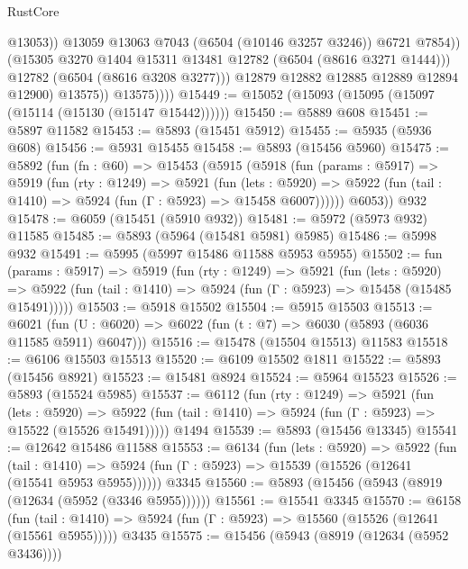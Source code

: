 \begin{lexlean}{RustCore}
\begin{coremodule}
                            @13053))
                        @13059
                        @13063
                        @7043
                        (@6504 (@10146 @3257 @3246))
                        @6721
                        @7854))
                    (@15305 @3270 @1404 @15311 @13481 @12782 (@6504 (@8616 @3271 @1444)))
                    @12782
                    (@6504 (@8616 @3208 @3277)))
                  @12879
                  @12882
                  @12885
                  @12889
                  @12894
                  @12900)
                @13575))
            @13575))))
@15449 := @15052 (@15093 (@15095 (@15097 (@15114 (@15130 (@15147 @15442))))))
@15450 := @5889 @608
@15451 := @5897 @11582
@15453 := @5893 (@15451 @5912)
@15455 := @5935 (@5936 @608)
@15456 := @5931 @15455
@15458 := @5893 (@15456 @5960)
@15475 := @5892
    (fun (fn : @60) =>
    @15453
      (@5915
        (@5918
          (fun (params : @5917) =>
          @5919
            (fun (rty : @1249) =>
            @5921
              (fun (lets : @5920) =>
              @5922 (fun (tail : @1410) => @5924 (fun (Γ : @5923) => @15458 @6007))))))
        @6053))
    @932
@15478 := @6059 (@15451 (@5910 @932))
@15481 := @5972 (@5973 @932) @11585
@15485 := @5893 (@5964 (@15481 @5981) @5985)
@15486 := @5998 @932
@15491 := @5995 (@5997 @15486 @11588 @5953 @5955)
@15502 := fun (params : @5917) =>
  @5919
    (fun (rty : @1249) =>
    @5921
      (fun (lets : @5920) =>
      @5922 (fun (tail : @1410) => @5924 (fun (Γ : @5923) => @15458 (@15485 @15491)))))
@15503 := @5918 @15502
@15504 := @5915 @15503
@15513 := @6021
    (fun (U : @6020) => @6022 (fun (t : @7) => @6030 (@5893 (@6036 @11585 @5911) @6047)))
@15516 := @15478 (@15504 @15513) @11583
@15518 := @6106 @15503 @15513
@15520 := @6109 @15502 @1811
@15522 := @5893 (@15456 @8921)
@15523 := @15481 @8924
@15524 := @5964 @15523
@15526 := @5893 (@15524 @5985)
@15537 := @6112
    (fun (rty : @1249) =>
    @5921
      (fun (lets : @5920) =>
      @5922 (fun (tail : @1410) => @5924 (fun (Γ : @5923) => @15522 (@15526 @15491)))))
    @1494
@15539 := @5893 (@15456 @13345)
@15541 := @12642 @15486 @11588
@15553 := @6134
    (fun (lets : @5920) =>
    @5922
      (fun (tail : @1410) =>
      @5924 (fun (Γ : @5923) => @15539 (@15526 (@12641 (@15541 @5953 @5955))))))
    @3345
@15560 := @5893 (@15456 (@5943 (@8919 (@12634 (@5952 (@3346 @5955))))))
@15561 := @15541 @3345
@15570 := @6158
    (fun (tail : @1410) => @5924 (fun (Γ : @5923) => @15560 (@15526 (@12641 (@15561 @5955)))))
    @3435
@15575 := @15456 (@5943 (@8919 (@12634 (@5952 @3436))))

\end{coremodule}
\end{lexlean}
